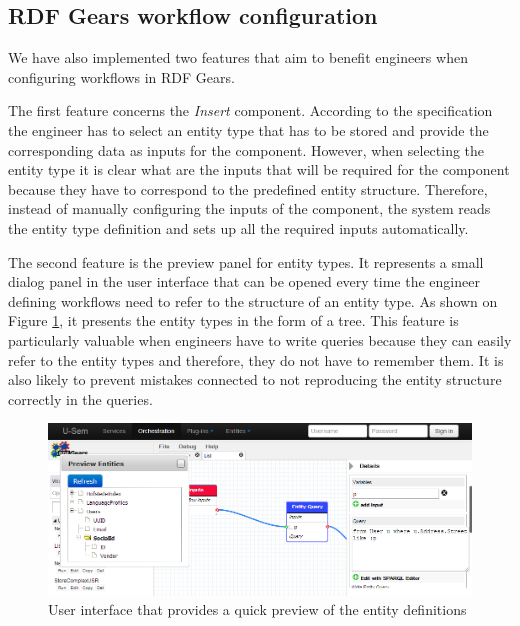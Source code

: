 \begin{itemize}
	\end{itemize}


\subsection{RDF Gears workflow configuration}
We have also implemented two features that aim to benefit engineers when configuring workflows in RDF Gears.

The first feature concerns the \textit{Insert} component. According to the specification the engineer has to select an entity type that has to be stored and provide the corresponding data as inputs for the component. However, when selecting the entity type it is clear what are the inputs that will be required for the component because they have to correspond to the predefined entity structure. Therefore, instead of manually configuring the inputs of the component, the system reads the entity type definition and sets up all the required inputs automatically.

The second feature is the preview panel for entity types. It represents a small dialog panel in the user interface that can be opened every time the engineer defining workflows need to refer to the structure of an entity type. As shown on Figure \ref{fig:storageEntityPreview}, it presents the entity types in the form of a tree. This feature is particularly valuable when engineers have to write queries because they can easily refer to the entity types and therefore, they do not have to remember them. It is also likely to prevent mistakes connected to not reproducing the entity structure correctly in the queries.

\begin{figure}[h!]
  \centering
  	\includegraphics[scale=0.55]{storage/ui/entityPreview.png}
  \caption{User interface that provides a quick preview of the entity definitions}
  \label{fig:storageEntityPreview}
\end{figure}

